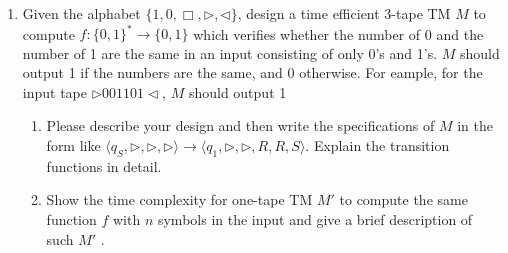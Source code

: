 \documentclass[12pt,a4paper]{article}
\theoremstyle{definition}
\begin{document}
\begin{enumerate}
    \item 
    Given the alphabet $\{1, 0, \Box, \triangleright, \triangleleft\}$, design a time efficient 3-tape TM $M$ to compute $f:\{0,1\}^*\rightarrow\{0,1\}$ which verifies whether the number of 0 and the number of 1 are the same in an input consisting of only 0's and 1's. $M$ should output 1 if the numbers are the same, and 0 otherwise. For eample, for the input tape $\triangleright 001101\triangleleft$, $M$ should output 1
    
    \begin{enumerate}
	    \item
	    Please describe your design and then write the specifications of $M$ in the form like $\langle q_S, \triangleright, \triangleright, \triangleright \rangle \rightarrow \langle q_1, \triangleright,\triangleright,  R, R, S \rangle$. Explain the transition functions in detail.
	    
	    \item 
	    Show the time complexity for one-tape TM $M'$ to compute the same function $f$ with $n$ symbols in the input and give a brief description of such $M'$ .
	
	\end{enumerate}


\end{enumerate}
\end{document}

